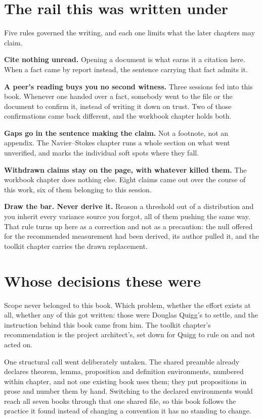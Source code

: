\section{The rail this was written under}

Five rules governed the writing, and each one limits what the later chapters may claim.

\textbf{Cite nothing unread.} Opening a document is what earns it a citation here. When a fact came
by report instead, the sentence carrying that fact admits it.

\textbf{A peer's reading buys you no second witness.} Three sessions fed into this book. Whenever
one handed over a fact, somebody went to the file or the document to confirm it, instead of writing
it down on trust. Two of those confirmations came back different, and the workbook chapter holds both.

\textbf{Gaps go in the sentence making the claim.} Not a footnote, not an appendix. The
Navier--Stokes chapter runs a whole section on what went unverified, and marks the individual soft
spots where they fall.

\textbf{Withdrawn claims stay on the page, with whatever killed them.} The workbook chapter does
nothing else. Eight claims came out over the course of this work, six of them belonging to this
session.

\textbf{Draw the bar. Never derive it.} Reason a threshold out of a distribution and you inherit
every variance source you forgot, all of them pushing the same way. That rule turns up here as a
correction and not as a precaution: the null offered for the recommended measurement had been
derived, its author pulled it, and the toolkit chapter carries the drawn replacement.

\section{Whose decisions these were}

Scope never belonged to this book. Which problem, whether the effort exists at all, whether any of
this got written: those were Douglas Quigg's to settle, and the instruction behind this book came
from him. The toolkit chapter's recommendation is the project architect's, set down for Quigg to
rule on and not acted on.

One structural call went deliberately untaken. The shared preamble already declares theorem, lemma,
proposition and definition environments, numbered within chapter, and not one existing book uses
them; they put propositions in prose and number them by hand. Switching to the declared environments
would reach all seven books through that one shared file, so this book follows the practice it found
instead of changing a convention it has no standing to change.
